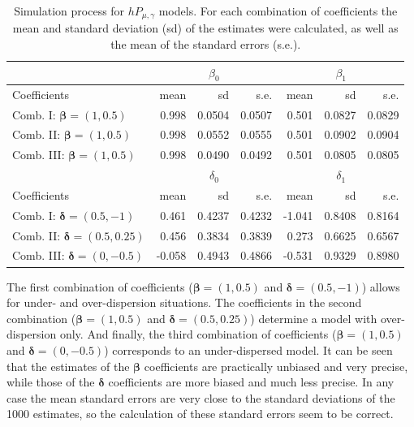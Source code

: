 \begin{table}[ht]
\centering
\begin{tabular}{lrrrrrr}
\toprule
  & \multicolumn{3}{c}{$\beta_0$} & \multicolumn{3}{c}{$\beta_1$} \\
  \midrule
  Coefficients & mean & sd & s.e. & mean & sd & s.e. \\
  \midrule
  Comb. I: $ \boldsymbol{\beta} = (1,0.5) $ & 0.998 & 0.0504 & 0.0507 & 0.501 & 0.0827 & 0.0829 \\
  Comb. II: $ \boldsymbol{\beta} = (1,0.5) $ & 0.998 & 0.0552 & 0.0555 & 0.501 & 0.0902 & 0.0904 \\
  Comb. III: $ \boldsymbol{\beta} = (1,0.5) $ & 0.998 & 0.0490 & 0.0492 & 0.501 & 0.0805 & 0.0805 \\
  \midrule
  & \multicolumn{3}{c}{$\delta_0$} & \multicolumn{3}{c}{$\delta_1$} \\
  \midrule
  Coefficients & mean & sd & s.e. & mean & sd & s.e. \\
  \midrule
  Comb. I: $ \boldsymbol{\delta} = (0.5,-1) $    & 0.461  & 0.4237 & 0.4232 & -1.041 & 0.8408 & 0.8164 \\
  Comb. II: $ \boldsymbol{\delta} = (0.5,0.25) $ & 0.456  & 0.3834 & 0.3839 & 0.273  & 0.6625 & 0.6567 \\
  Comb. III: $ \boldsymbol{\delta} = (0,-0.5) $  & -0.058 & 0.4943 & 0.4866 & -0.531 & 0.9329 & 0.8980 \\
   \bottomrule
\end{tabular}
\caption{Simulation process for $hP_{\mu, \gamma}$ models. For each combination of coefficients the mean and standard deviation (sd) of the estimates were calculated, as well as the mean of the standard errors (s.e.).}\label{tab_simulation}
\end{table}

The first combination of coefficients ($ \boldsymbol{\beta} = (1,0.5) $ and $\boldsymbol{\delta} = (0.5,-1) $) allows for under- and over-dispersion situations. The coefficients in the second combination ($ \boldsymbol{\beta} = (1,0.5) $ and $\boldsymbol{\delta} = (0.5, 0.25) $) determine a model with over-dispersion only. And finally, the third combination of coefficients ($ \boldsymbol{\beta} = (1,0.5) $ and $\boldsymbol{\delta} = (0, -0.5) $) corresponds to an under-dispersed model. It can be seen that the estimates of the $\boldsymbol{\beta}$ coefficients are practically unbiased and very precise, while those of the $\boldsymbol{\delta}$ coefficients are more biased and much less precise. In any case the mean standard errors are very close to the standard deviations of the 1000 estimates, so the calculation of these standard errors seem to be correct.

